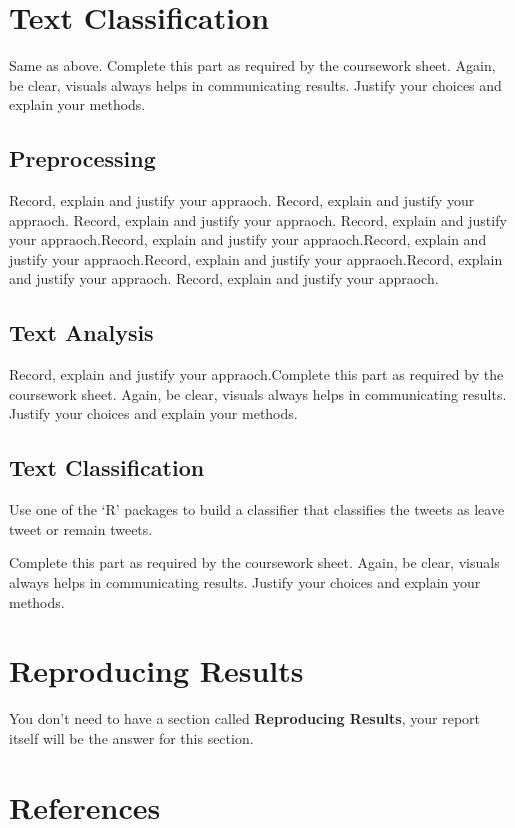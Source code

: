 \documentclass[10pt]{article}\usepackage[]{graphicx}\usepackage[]{color}
\begin{document}
\section {Text Classification}

Same as above. Complete this part as required by the coursework sheet. Again, be clear, visuals always helps in communicating results. Justify your choices and explain your methods. 


\subsection{Preprocessing}

Record, explain and justify your appraoch. Record, explain and justify your appraoch. 
Record, explain and justify your appraoch. Record, explain and justify your appraoch.Record, explain and justify your appraoch.Record, explain and justify your appraoch.Record, explain and justify your appraoch.Record, explain and justify your appraoch. 
Record, explain and justify your appraoch. 


\subsection{Text Analysis}

Record, explain and justify your appraoch.Complete this part as required by the coursework sheet. Again, be clear, visuals always helps in communicating results. Justify your choices and explain your methods. 



\subsection{Text Classification}

Use one of the ‘R’ packages to build a classifier that classifies the tweets as leave tweet or remain tweets. 

Complete this part as required by the coursework sheet. Again, be clear, visuals always helps in communicating results. Justify your choices and explain your methods. 


\section{Reproducing Results}

You don't need to have a section called \textbf{Reproducing Results}, your report itself will be the answer for this section. 



\clearpage

\section{References}\label{pubs}

\printbibliography[heading =none]


\clearpage
\end{document}
